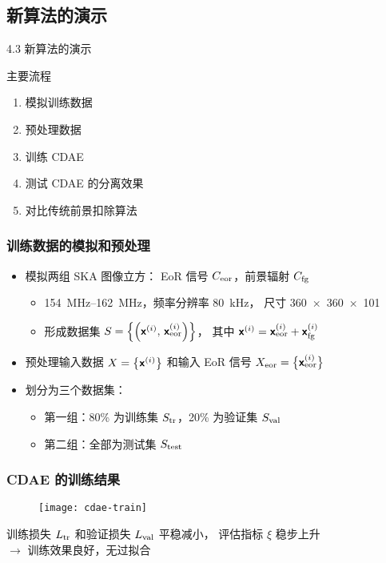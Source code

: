 \documentclass{beamer}
\begin{document}
\subsection{新算法的演示}

\begin{frame}{4.3 新算法的演示}
  \begin{alertblock}{主要流程}
    \begin{enumerate}
      \item 模拟训练数据
      \item 预处理数据
      \item 训练 CDAE
      \item 测试 CDAE 的分离效果
      \item 对比传统前景扣除算法
    \end{enumerate}
  \end{alertblock}
\end{frame}

\begin{frame}[subsec]
  \frametitle{训练数据的模拟和预处理}
  \begin{itemize}
    \item 模拟两组 SKA 图像立方：
      EoR 信号 $C_{\text{eor}}$，前景辐射 $C_{\text{fg}}$
      \begin{itemize}
        \item \SIrange{154}{162}{\MHz}，频率分辨率 \SI{80}{\kHz}，
          尺寸 \num{360 x 360 x 101}
        \item 形成数据集 $S = \left\{ \left(\bm{\mathsf{x}}^{(i)},
          \,\bm{\mathsf{x}}^{(i)}_{\text{eor}} \right) \right\}$，
          其中 $\bm{\mathsf{x}}^{(i)} = \bm{\mathsf{x}}^{(i)}_{\text{eor}} + \bm{\mathsf{x}}^{(i)}_{\text{fg}}$
      \end{itemize}
    \item 预处理输入数据 $X = \big\{ \bm{\mathsf{x}}^{(i)} \big\}$
      和输入 EoR 信号 $X_{\text{eor}} = \big\{ \bm{\mathsf{x}}^{(i)}_{\text{eor}} \big\}$
    \item 划分为三个数据集：
      \begin{itemize}
        \item 第一组：80\% 为训练集 $S_{\text{tr}}$，20\% 为验证集 $S_{\text{val}}$
        \item 第二组：全部为测试集 $S_{\text{test}}$
      \end{itemize}
  \end{itemize}
\end{frame}

\begin{frame}[subsec]
  \frametitle{CDAE 的训练结果}

  \begin{figure}
    \centering
    \texttt{[image: cdae-train]}
  \end{figure}

  训练损失 $L_{\text{tr}}$ 和验证损失 $L_{\text{val}}$ 平稳减小，
  评估指标 $\xi$ 稳步上升 \\
  $\rightarrow$
  训练效果良好，无过拟合
\end{frame}
\end{document}
